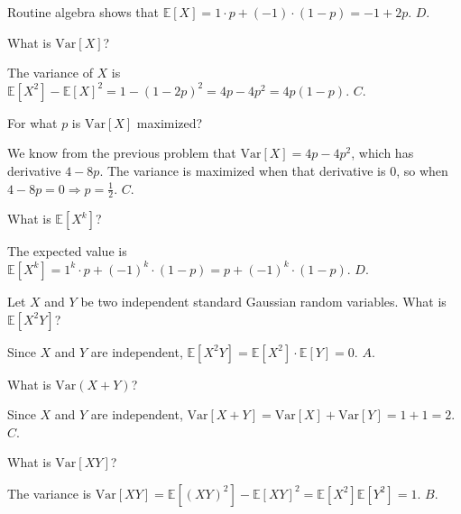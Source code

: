 \documentclass[a4paper]{article}
\begin{document}
\begin{Solution}
	Routine algebra shows that $\mathbb{E}[X] = 1 \cdot p + (-1) \cdot (1 - p) = -1 + 2p.$ $\boxed{D}$.
\end{Solution}
\begin{Exercise}
	What is $\text{Var}[X]$?
\end{Exercise}
\begin{Solution}
	The variance of $X$ is $\mathbb{E}[X^2] - \mathbb{E}[X]^2 = 1 - (1 - 2p)^2 = 4p - 4p^2 = 4p (1 - p).$ $\boxed{C}$.
\end{Solution}
\begin{Exercise}
	For what $p$ is $\text{Var}[X]$ maximized?
\end{Exercise}
\begin{Solution}
	We know from the previous problem that $\text{Var}[X] = 4p - 4p^2$, which has derivative $4 - 8p$. The variance is maximized when that derivative is $0$, so when $4 - 8p = 0 \Longrightarrow p = \frac{1}{2}.$ $\boxed{C}$.
\end{Solution}
\begin{Exercise}
	What is $\mathbb{E}[X^k]$?
\end{Exercise}
\begin{Solution}
	The expected value is $\mathbb{E}[X^k] = 1^k \cdot p + (-1)^k \cdot (1 - p) = p + (-1)^k \cdot (1 - p)$. $\boxed{D}$.
\end{Solution}
\begin{Exercise}
	Let $X$ and $Y$ be two independent standard Gaussian random variables. What is $\mathbb{E}[X^2Y]$?
\end{Exercise}
\begin{Solution}
	Since $X$ and $Y$ are independent, $\mathbb{E}[X^2Y] = \mathbb{E}[X^2] \cdot \mathbb{E}[Y] = 0.$ $\boxed{A}$.
\end{Solution}
\begin{Exercise}
	What is $\text{Var}(X + Y)$?
\end{Exercise}
\begin{Solution}
	Since $X$ and $Y$ are independent, $\text{Var}[X + Y] = \text{Var}[X] + \text{Var}[Y] = 1 + 1 = 2.$ $\boxed{C}$.
\end{Solution}
\begin{Exercise}
	What is $\text{Var}[XY]$?
\end{Exercise}
\begin{Solution}
	The variance is $\text{Var}[XY] = \mathbb{E}[(XY)^2] - \mathbb{E}[XY]^2 = \mathbb{E}[X^2] \mathbb{E}[Y^2] = 1.$ $\boxed{B}$.
\end{Solution}
\end{document}
